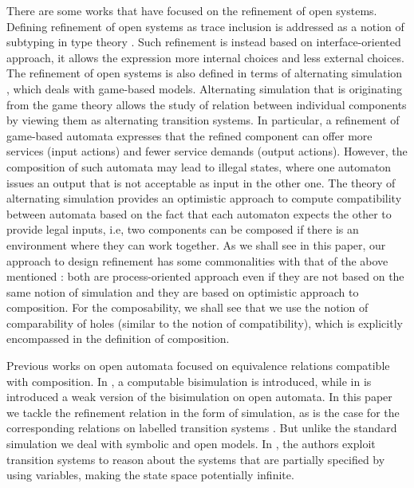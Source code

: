 \documentclass[runningheads]{llncs}
\begin{document}
There are some works that have focused on  the refinement of open systems. Defining refinement of open systems as trace inclusion  is  addressed  as a notion of subtyping in type theory 
\cite{GayH:2005,BravettiZ:2021}. Such refinement is  instead based  on interface-oriented approach, it allows the expression more internal choices and less external choices. The refinement of open systems is also defined in terms of  alternating simulation \cite{Alur:1998,deAlfaro:2021}, which deals with game-based models.
Alternating simulation that is originating from the game theory \cite{deAlfaro:2003} allows  the study of relation between individual components by viewing them as alternating transition systems. In particular,  a refinement of game-based automata expresses that the refined component can offer more services (input actions) and fewer service demands (output actions). However, the composition of such automata may
lead to illegal states, where one automaton issues an output that is not acceptable as input in the other one. The theory of alternating simulation provides an optimistic approach to compute compatibility between automata based on the fact that each automaton expects the other to provide  legal inputs, i.e, two components can be composed if there is an environment where they can work together. As we shall see in this paper, 
our approach to design refinement  has some commonalities with that of the above mentioned \cite{deAlfaro:2021}: both are process-oriented approach even if they are not based on the same notion of simulation and they are based on optimistic approach to composition. 
For the composability, we shall see that we use the notion of comparability of holes (similar to the notion of compatibility), which is explicitly encompassed in the definition of composition.

 



Previous works on open automata focused on equivalence relations compatible with composition.
In  \cite{10.1145/3372884.3373161}, a computable bisimulation is introduced, while in \cite{fhbisim} is introduced a weak version of the bisimulation on open automata. 
In this paper we tackle the refinement relation in the form of simulation, as is the case for the corresponding relations on labelled transition systems \cite{10.1007/3-540-46428-X_19}. But unlike the standard simulation we deal with symbolic and open models. In \cite{Zhang2014}, the authors exploit transition systems to reason about the systems  that are partially specified by using variables, making  the state space potentially infinite.
\end{document}
